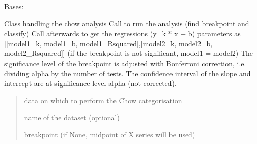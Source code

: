 \documentclass[letterpaper,10pt,english]{sphinxmanual}
\begin{document}
\begin{fulllineitems}
\label{\detokenize{source/chowclassifier:chowclassifier.chow.Chow}}
\pysigstartsignatures
{}
\pysigstopsignatures
\sphinxAtStartPar
Bases: 

\sphinxAtStartPar
Class handling the chow analysis
Call  to run the analysis (find breakpoint and classify)
Call afterwards  to get the regressions (y=k * x + b) parameters as
{[}{[}model1\_k, model1\_b, model1\_Rsquared{]},{[}model2\_k, model2\_b, model2\_Rsquared{]}{]}
(if the breakpoint is not significant, model1 = model2)
The significance level of the breakpoint is adjusted with Bonferroni correction,
i.e. dividing alpha by the number of tests. The confidence interval of the slope
and intercept are at significance level alpha (not corrected).
\begin{quote}\begin{description}
\sphinxAtStartPar
data on which to perform the Chow categorisation

\sphinxAtStartPar
name of the dataset (optional)

\sphinxAtStartPar
breakpoint (if None, midpoint of X series will be used)


\end{description}
\end{quote}
\end{fulllineitems}
\end{document}
